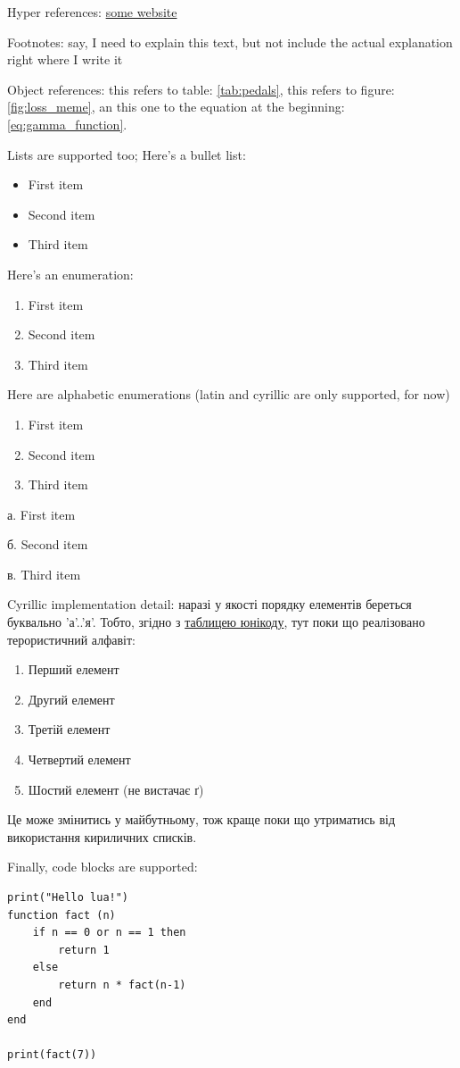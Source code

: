 \documentclass[a4paper]{article}
\newcommand{\tbln}{
    \newline 
    \hspace*{10mm}
} %
\begin{document}
\tbln Hyper references: \href{https://www.somewebsite.com/}{some website}
\tbln Footnotes: say, I need to explain this text, but not include the actual explanation right where I write it\footnotemark[1]
\tbln Object references: this refers to table: \ref{tab:pedals}, this refers to figure: \ref{fig:loss_meme}, an this one to the equation at the beginning: \ref{eq:gamma_function}.
\tbln Lists are supported too; Here's a bullet list:
\begin{itemize}
\item First item
\item Second item
\item Third item
\end{itemize}
\tbln Here's an enumeration:
\begin{enumerate}
\item First item
\item Second item
\item Third item
\end{enumerate}
\tbln Here are alphabetic enumerations (latin and cyrillic are only supported, for now)
\begin{enumerate}[label=\alph*), ref=\alph*]
\item First item
\item Second item
\item Third item
\end{enumerate}
\tbln а. First item
\tbln б. Second item
\tbln в. Third item
\tbln Cyrillic implementation detail: наразі у якості порядку елементів береться буквально 'а'..'я'. Тобто, згідно з \href{https://en.wikipedia.org/wiki/Cyrillic_(Unicode_block)}{таблицею юнікоду}, тут поки що реалізовано терористичний алфавіт:
\begin{enumerate}[label=\asbuk*), ref=\asbuk*]
\item Перший елемент
\item Другий елемент
\item Третій елемент
\item Четвертий елемент
\item Шостий елемент (не вистачає ґ)
\end{enumerate}
\tbln Це може змінитись у майбутньому, тож краще поки що утриматись від використання кириличних списків.
\tbln Finally, code blocks are supported:
\begin{verbatim}
print("Hello lua!")
function fact (n)
    if n == 0 or n == 1 then
        return 1
    else
        return n * fact(n-1)
    end
end

print(fact(7))
\end{verbatim}
\end{document}
